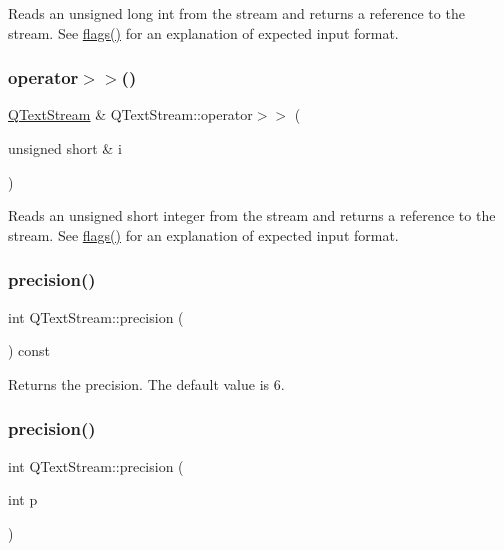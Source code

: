 Reads an unsigned {\ttfamily long} int from the stream and returns a reference to the stream. See \mbox{\hyperlink{class_q_text_stream_ab6cf395446ba04973dff067ab8b36978}{flags()}} for an explanation of expected input format. \mbox{\label{class_q_text_stream_a5066c61f0e08736f3b99fffd02041a1f}} 
\subsubsection{\texorpdfstring{operator$>$$>$()}{operator>>()}\hspace{0.1cm}{\footnotesize\ttfamily [13/13]}}
{\footnotesize\ttfamily \mbox{\hyperlink{class_q_text_stream}{Q\+Text\+Stream}} \& Q\+Text\+Stream\+::operator$>$$>$ (\begin{DoxyParamCaption}\item[{unsigned short \&}]{i }\end{DoxyParamCaption})}

Reads an unsigned {\ttfamily short} integer from the stream and returns a reference to the stream. See \mbox{\hyperlink{class_q_text_stream_ab6cf395446ba04973dff067ab8b36978}{flags()}} for an explanation of expected input format. \mbox{\label{class_q_text_stream_a180cd0f2bd8796ba012d338537a2005b}} 
\subsubsection{\texorpdfstring{precision()}{precision()}\hspace{0.1cm}{\footnotesize\ttfamily [1/2]}}
{\footnotesize\ttfamily int Q\+Text\+Stream\+::precision (\begin{DoxyParamCaption}{ }\end{DoxyParamCaption}) const\hspace{0.3cm}{\ttfamily [inline]}}

Returns the precision. The default value is 6. \mbox{\label{class_q_text_stream_afed018ad42135061a188a45d265516ad}} 
\subsubsection{\texorpdfstring{precision()}{precision()}\hspace{0.1cm}{\footnotesize\ttfamily [2/2]}}
{\footnotesize\ttfamily int Q\+Text\+Stream\+::precision (\begin{DoxyParamCaption}\item[{int}]{p }\end{DoxyParamCaption})\hspace{0.3cm}{\ttfamily [inline]}}

